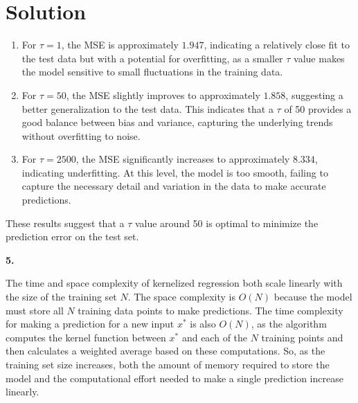 \documentclass[submit]{harvardml}
\newenvironment{solution}
  {\color{blue}\section*{Solution}}
{}
\begin{document}
\begin{solution}
\begin{enumerate}
    \item For \(\tau = 1\), the MSE is approximately \(1.947\), indicating a relatively close fit to the test data but with a potential for overfitting, as a smaller \(\tau\) value makes the model sensitive to small fluctuations in the training data.
    \item For \(\tau = 50\), the MSE slightly improves to approximately \(1.858\), suggesting a better generalization to the test data. This indicates that a \(\tau\) of 50 provides a good balance between bias and variance, capturing the underlying trends without overfitting to noise.
    \item For \(\tau = 2500\), the MSE significantly increases to approximately \(8.334\), indicating underfitting. At this level, the model is too smooth, failing to capture the necessary detail and variation in the data to make accurate predictions.
\end{enumerate}

These results suggest that a \(\tau\) value around 50 is optimal to minimize the prediction error on the test set.

\bigskip
\textbf{5.}

The time and space complexity of kernelized regression both scale linearly with the size of the training set \(N\). The space complexity is \(O(N)\) because the model must store all \(N\) training data points to make predictions. The time complexity for making a prediction for a new input \(x^*\) is also \(O(N)\), as the algorithm computes the kernel function between \(x^*\) and each of the \(N\) training points and then calculates a weighted average based on these computations. So, as the training set size increases, both the amount of memory required to store the model and the computational effort needed to make a single prediction increase linearly.

\end{solution}

\end{document}
